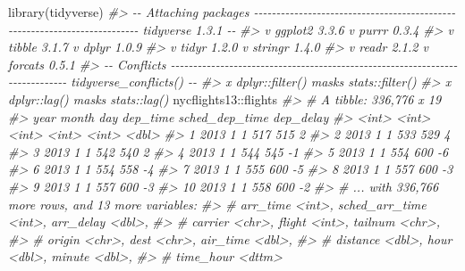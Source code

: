 \documentclass[
]{book}
\newenvironment{Shaded}{\begin{snugshade}}{\end{snugshade}}
\newcommand{\CommentTok}[1]{\textcolor[rgb]{0.56,0.35,0.01}{\textit{#1}}}
\newcommand{\FunctionTok}[1]{\textcolor[rgb]{0.00,0.00,0.00}{#1}}
\newcommand{\NormalTok}[1]{#1}
\newcommand{\SpecialCharTok}[1]{\textcolor[rgb]{0.00,0.00,0.00}{#1}}
\begin{document}
\begin{Shaded}
\begin{Highlighting}[]
\FunctionTok{library}\NormalTok{(tidyverse)}
\CommentTok{\#\textgreater{} {-}{-} Attaching packages {-}{-}{-}{-}{-}{-}{-}{-}{-}{-}{-}{-}{-}{-}{-}{-}{-}{-}{-}{-}{-}{-}{-}{-}{-}{-}{-}{-}{-}{-}{-}{-}{-}{-}{-}{-}{-}{-}{-}{-}{-}{-}{-}{-}{-}{-}{-}{-}{-}{-}{-}{-}{-}{-}{-}{-}{-}{-}{-}{-}{-}{-}{-}{-}{-}{-}{-}{-}{-}{-}{-}{-}{-}{-} tidyverse 1.3.1 {-}{-}}
\CommentTok{\#\textgreater{} v ggplot2 3.3.6     v purrr   0.3.4}
\CommentTok{\#\textgreater{} v tibble  3.1.7     v dplyr   1.0.9}
\CommentTok{\#\textgreater{} v tidyr   1.2.0     v stringr 1.4.0}
\CommentTok{\#\textgreater{} v readr   2.1.2     v forcats 0.5.1}
\CommentTok{\#\textgreater{} {-}{-} Conflicts {-}{-}{-}{-}{-}{-}{-}{-}{-}{-}{-}{-}{-}{-}{-}{-}{-}{-}{-}{-}{-}{-}{-}{-}{-}{-}{-}{-}{-}{-}{-}{-}{-}{-}{-}{-}{-}{-}{-}{-}{-}{-}{-}{-}{-}{-}{-}{-}{-}{-}{-}{-}{-}{-}{-}{-}{-}{-}{-}{-}{-}{-}{-}{-}{-}{-}{-}{-}{-}{-}{-}{-}{-}{-}{-}{-}{-} tidyverse\_conflicts() {-}{-}}
\CommentTok{\#\textgreater{} x dplyr::filter() masks stats::filter()}
\CommentTok{\#\textgreater{} x dplyr::lag()    masks stats::lag()}
\NormalTok{nycflights13}\SpecialCharTok{::}\NormalTok{flights}
\CommentTok{\#\textgreater{} \# A tibble: 336,776 x 19}
\CommentTok{\#\textgreater{}     year month   day dep\_time sched\_dep\_time dep\_delay}
\CommentTok{\#\textgreater{}    \textless{}int\textgreater{} \textless{}int\textgreater{} \textless{}int\textgreater{}    \textless{}int\textgreater{}          \textless{}int\textgreater{}     \textless{}dbl\textgreater{}}
\CommentTok{\#\textgreater{}  1  2013     1     1      517            515         2}
\CommentTok{\#\textgreater{}  2  2013     1     1      533            529         4}
\CommentTok{\#\textgreater{}  3  2013     1     1      542            540         2}
\CommentTok{\#\textgreater{}  4  2013     1     1      544            545        {-}1}
\CommentTok{\#\textgreater{}  5  2013     1     1      554            600        {-}6}
\CommentTok{\#\textgreater{}  6  2013     1     1      554            558        {-}4}
\CommentTok{\#\textgreater{}  7  2013     1     1      555            600        {-}5}
\CommentTok{\#\textgreater{}  8  2013     1     1      557            600        {-}3}
\CommentTok{\#\textgreater{}  9  2013     1     1      557            600        {-}3}
\CommentTok{\#\textgreater{} 10  2013     1     1      558            600        {-}2}
\CommentTok{\#\textgreater{} \# ... with 336,766 more rows, and 13 more variables:}
\CommentTok{\#\textgreater{} \#   arr\_time \textless{}int\textgreater{}, sched\_arr\_time \textless{}int\textgreater{}, arr\_delay \textless{}dbl\textgreater{},}
\CommentTok{\#\textgreater{} \#   carrier \textless{}chr\textgreater{}, flight \textless{}int\textgreater{}, tailnum \textless{}chr\textgreater{},}
\CommentTok{\#\textgreater{} \#   origin \textless{}chr\textgreater{}, dest \textless{}chr\textgreater{}, air\_time \textless{}dbl\textgreater{},}
\CommentTok{\#\textgreater{} \#   distance \textless{}dbl\textgreater{}, hour \textless{}dbl\textgreater{}, minute \textless{}dbl\textgreater{},}
\CommentTok{\#\textgreater{} \#   time\_hour \textless{}dttm\textgreater{}}
\end{Highlighting}
\end{Shaded}
\end{document}

